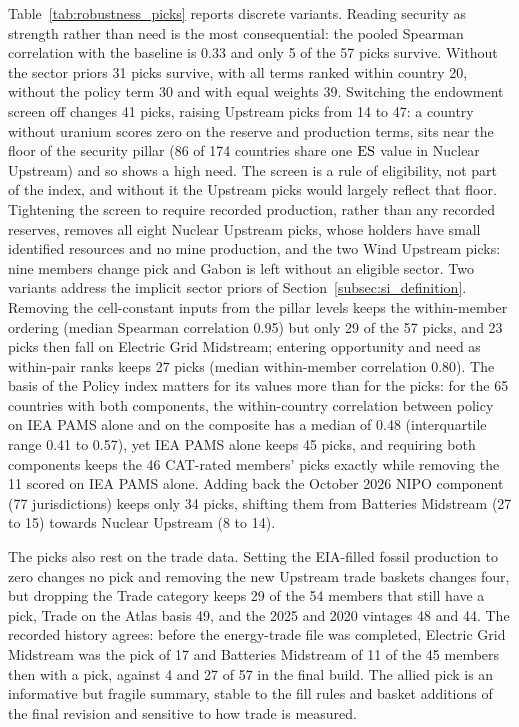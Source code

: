 Table~\ref{tab:robustness_picks} reports discrete variants. Reading security as strength rather
than need is the most consequential: the pooled Spearman correlation with the baseline is 0.33 and
only 5 of the 57 picks survive. Without the sector priors 31 picks survive, with all terms ranked
within country 20, without the policy term 30 and with equal weights 39. Switching the endowment
screen off changes 41 picks, raising Upstream picks from 14 to 47: a country without uranium scores
zero on the reserve and production terms, sits near the floor of the security pillar (86 of 174
countries share one $\mathrm{ES}$ value in Nuclear Upstream) and so shows a high need. The screen is a rule
of eligibility, not part of the index, and without it the Upstream picks would largely reflect that
floor. Tightening the screen to require recorded production, rather than any recorded
reserves, removes all eight Nuclear Upstream picks, whose holders have small identified resources
and no mine production, and the two Wind Upstream picks: nine members change pick and Gabon is left
without an eligible sector. Two variants address the implicit sector priors of
Section~\ref{subsec:si_definition}. Removing the cell-constant inputs from the pillar levels keeps
the within-member ordering (median Spearman correlation 0.95) but only 29 of the 57 picks, and 23 picks
then fall on Electric Grid Midstream; entering opportunity and need as within-pair ranks keeps 27
picks (median within-member correlation 0.80). The basis of the Policy index matters for its values more than for the picks: for the 65
countries with both components, the within-country correlation between policy on IEA PAMS alone and
on the composite has a median of 0.48 (interquartile range 0.41 to 0.57), yet IEA PAMS alone keeps
45 picks, and requiring both components keeps the 46 CAT-rated members' picks exactly while removing
the 11 scored on IEA PAMS alone. Adding back the October 2026 NIPO component (77 jurisdictions)
keeps only 34 picks, shifting them from Batteries Midstream (27 to 15) towards Nuclear Upstream (8 to
14).

The picks also rest on the trade data. Setting the EIA-filled fossil production to zero changes no
pick and removing the new Upstream trade baskets changes four, but dropping the Trade category keeps
29 of the 54 members that still have a pick, Trade on the Atlas basis 49, and the 2025 and 2020
vintages 48 and 44. The recorded history agrees: before the energy-trade file was completed,
Electric Grid Midstream was the pick of 17 and Batteries Midstream of 11 of the 45 members then with
a pick, against 4 and 27 of 57 in the final build. The allied pick is an informative but fragile summary, stable to the fill rules and
basket additions of the final revision and sensitive to how trade is measured.

